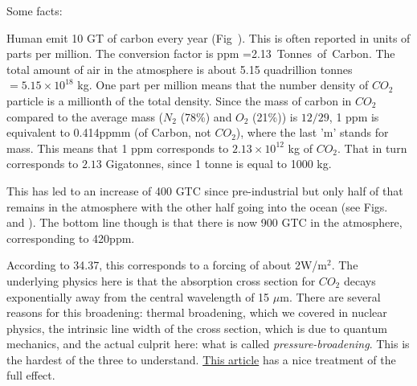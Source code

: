 \documentclass[11pt]{book}
\begin{document}


Some facts:
\bee
\item Human emit 10 GT of carbon every year (Fig~). This is often reported in units of parts per million. The conversion factor is
 {\rm ppm} =2.13 \,{\rm Tonnes\, of\, Carbon}.
\ee
The total amount of air in the atmosphere is about 5.15 quadrillion tonnes $=5.15\times 10^{18}$ kg. One part per million means that the number density of $CO_2$ particle is a millionth of the total density. Since the mass of carbon in $CO_2$ compared to the average mass ($N_2$ (78\%) and $O_2$ (21\%)) is $12/29$, 1 ppm is equivalent to 0.414ppmm (of Carbon, not $CO_2$), where the last 'm' stands for mass. This means that 1 ppm corresponds to $2.13\times10^{12}$ kg of $CO_2$. That in turn corresponds to $2.13$ Gigatonnes, since 1 tonne is equal to 1000 kg.
\item This has led to an increase of 400 GTC since pre-industrial but only half of that remains in the atmosphere with the other half going into the ocean (see Figs.~ and ).
The bottom line though is that there is now 900 GTC in the atmosphere, corresponding to 420ppm.
\item According to 34.37, this corresponds to a forcing of about 2W/m$^2$. The underlying physics here is that the absorption cross section for $CO_2$ decays exponentially away from the central wavelength of 15 $\mu$m. There are several reasons for this broadening: thermal broadening, which we covered in nuclear physics, the intrinsic line width of the cross section, which is due to quantum mechanics, and the actual culprit here: what is called {\it pressure-broadening}. This is the hardest of the three to understand. \href{https://iopscience.iop.org/article/10.1088/1361-6463/aabac6#daabac6eqn037}{This article} has a nice treatment of the full effect.
\end{document}
